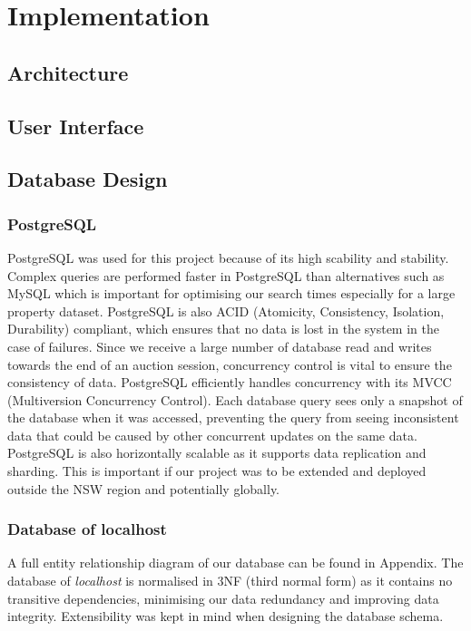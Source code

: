 \section{Implementation}
\subsection{Architecture}
\subsection{User Interface}
\subsection{Database Design}
\subsubsection{PostgreSQL}

PostgreSQL was used for this project because of its high scability and stability.
Complex queries are performed faster in PostgreSQL than alternatives such as MySQL
which is important for optimising our search times especially for a large property
dataset. PostgreSQL is also ACID (Atomicity, Consistency, Isolation, Durability)
compliant, which ensures that no data is lost in the system in the case of failures.
Since we receive a large number of database read and writes towards the end
of an auction session, concurrency control is vital to ensure the consistency
of data. PostgreSQL efficiently handles concurrency with its MVCC (Multiversion
Concurrency Control). Each database query sees only a snapshot of the database
when it was accessed, preventing the query from seeing inconsistent data that
could be caused by other concurrent updates on the same data. PostgreSQL is also
horizontally scalable as it supports data replication and sharding.
This is important if our project was to be extended and deployed outside the NSW
region and potentially globally.

\subsubsection{Database of localhost}

A full entity relationship diagram of our database can be found in Appendix.
The database of \emph{localhost} is normalised in 3NF (third normal form) as it
contains no transitive dependencies, minimising our data redundancy and
improving data integrity. Extensibility was kept in mind when designing the
database schema.

